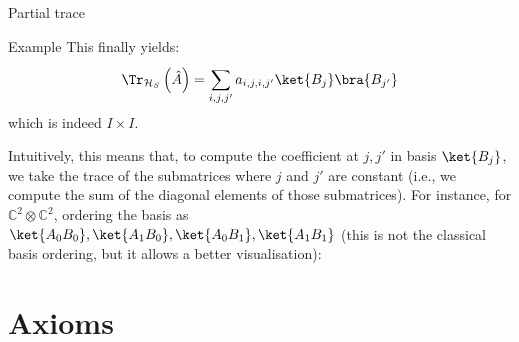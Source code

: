 \documentclass[a4paper]{article}
\begin{document}
\begin{parag}{Partial trace}
\begin{subparag}{Example}
        This finally yields: 
        \[\Tr_{\mathcal{H}_S}\left(\hat{A}\right) = \sum_{i, j, j'}^{} a_{i, j, i, j'} \ket{B_j}\bra{B_{j'}}\]
        which is indeed $I \times I$.

        Intuitively, this means that, to compute the coefficient at $j, j'$ in basis $\ket{B_j}$, we take the trace of the submatrices where $j$ and $j'$ are constant (i.e., we compute the sum of the diagonal elements of those submatrices). For instance, for $\mathbb{C}^2 \otimes \mathbb{C}^2$, ordering the basis as $\ket{A_0 B_0}, \ket{A_1 B_0}, \ket{A_0 B_1}, \ket{A_1 B_1}$ (this is not the classical basis ordering, but it allows a better visualisation): 
    \end{subparag}
\end{parag}

\section{Axioms}
\end{document}
